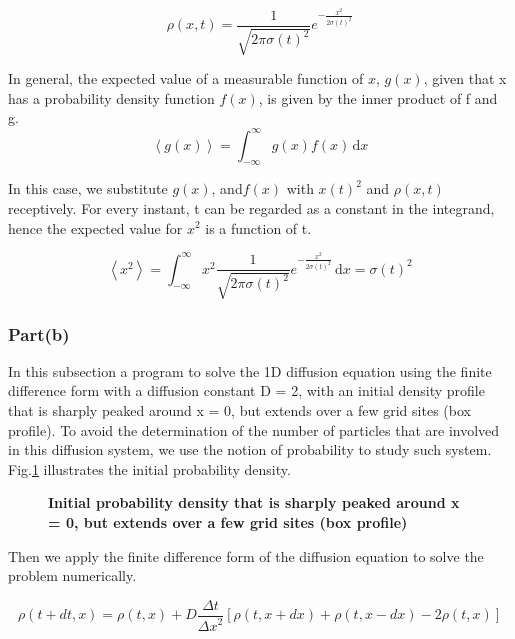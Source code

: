 \documentclass[11pt, oneside]{article}   	%
\begin{document}
\begin{equation}\label{11}
\rho(x,t)=\frac{1}{\sqrt{2\pi \sigma(t)^2}}e^{-\frac{x^2}{2\sigma(t)^2}}
\end{equation}

In general, the expected value of a measurable function of $x$, $g(x)$, given that x has a probability density function $f(x)$, is given by the inner product of f and g.
\begin{equation*}
\left \langle g(x) \right\rangle= \int_{-\infty}^{\infty} g(x)f(x)\, \mathrm{d}x
\end{equation*}

In this case, we substitute $g(x)$, and$f(x)$ with $x(t)^2$ and $\rho(x,t)$ receptively. For every instant, t can be regarded as a constant in the integrand, hence the expected value for $x^2$ is a function of t.

\begin{equation*}
\left \langle x^2 \right\rangle= \int_{-\infty}^{\infty} x^2\frac{1}{\sqrt{2\pi \sigma(t)^2}}e^{-\frac{x^2}{2\sigma(t)^2}}\, \mathrm{d}x=\sigma(t)^2
\end{equation*}

\subsubsection{Part(b)}
In this subsection a program to solve the 1D diffusion equation using the finite difference form with a diffusion constant D = 2, with an initial density profile that is sharply peaked around x = 0, but extends over a few grid sites (box profile). To avoid the determination of the number of  particles  that are involved in this diffusion system, we use the notion of probability to study such system. 
Fig.\ref{fig1} illustrates the initial probability density.

\begin{figure}[htbp]
\begin{center}
\caption{{\bf  Initial probability density that is sharply peaked around x = 0, but extends over a few grid sites (box profile)}}
\label{fig1}
\end{center}
\end{figure}

Then we apply the finite difference form of the diffusion equation to solve the problem numerically.

\begin{equation*}
\rho(t+dt,x)=\rho(t,x)+D\frac{\Delta t}{{\Delta x}^2}[\rho(t,x+dx)+\rho(t,x-dx)-2\rho(t,x)]
\end{equation*}
\end{document}
